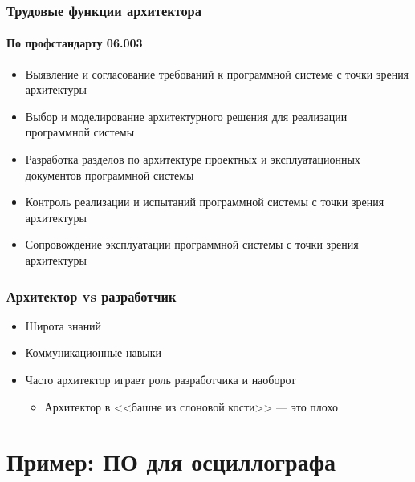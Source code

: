 \documentclass{../mcsslides}
\begin{document}
    \begin{frame}
        \frametitle{Трудовые функции архитектора}
        \framesubtitle{По профстандарту 06.003}
        \begin{itemize}
            \item Выявление и согласование требований к программной системе с точки зрения архитектуры
            \item Выбор и моделирование архитектурного решения для реализации программной системы
            \item Разработка разделов по архитектуре проектных и эксплуатационных документов программной системы
            \item Контроль реализации и испытаний программной системы с точки зрения архитектуры
            \item Сопровождение эксплуатации программной системы с точки зрения архитектуры
        \end{itemize}
    \end{frame}

    \begin{frame}
        \frametitle{Архитектор vs разработчик}
        \begin{itemize}
            \item Широта знаний
            \item Коммуникационные навыки
            \item Часто архитектор играет роль разработчика и наоборот
            \begin{itemize}
                \item Архитектор в <<башне из слоновой кости>> --- это плохо
            \end{itemize}
        \end{itemize}
    \end{frame}

    \section{Пример: ПО для осциллографа}
\end{document}
